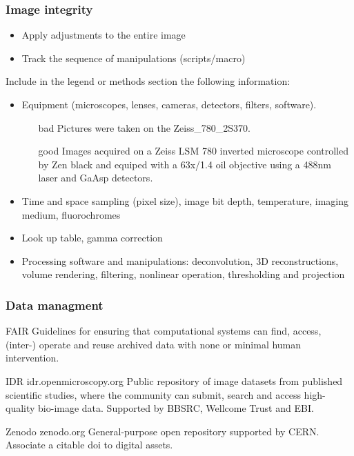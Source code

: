 \documentclass[ignorenonframetext,aspectratio=169,10pt,xcolor=table]{beamer}
\begin{document}
\begin{frame} \frametitle{Image integrity}

  \begin{itemize}
  \item Apply adjustments to the entire image
  \item Track the sequence of manipulations (scripts/macro)
  \end{itemize}


  Include in the legend or methods section the following
  information:
  \begin{itemize}\small

  \item Equipment (microscopes, lenses, cameras, detectors,
    filters, software).

     \begin{itemize}
     \item[bad] Pictures were taken on the Zeiss\_780\_2S370.
     \item[good] Images acquired on a Zeiss LSM 780 inverted
    microscope controlled by Zen black and equiped with a 63x/1.4 oil
    objective using a 488nm laser and GaAsp detectors.
     \end{itemize}

  \item Time and space sampling (pixel size), image bit depth,
    temperature, imaging medium, fluorochromes
  \item Look up table, gamma correction
  \item Processing software and manipulations: deconvolution, 3D reconstructions, volume rendering, filtering, nonlinear operation, thresholding and projection
  \end{itemize}

   

\end{frame}

\begin{frame} \frametitle{Data managment}

  \begin{block}{FAIR}
    Guidelines for ensuring that computational systems can find, access, (inter-)
    operate and reuse archived data with none or minimal human intervention.
  \end{block}

  \begin{block}{IDR idr.openmicroscopy.org}
    Public repository of image datasets from published scientific studies, where
    the community can submit, search and access high-quality bio-image data.
    Supported by BBSRC, Wellcome Trust and EBI.
  \end{block}

  \begin{block}{Zenodo zenodo.org}
    General-purpose open repository supported by CERN. Associate a citable doi
    to digital assets.
  \end{block}

   
\end{frame}
\end{document}
